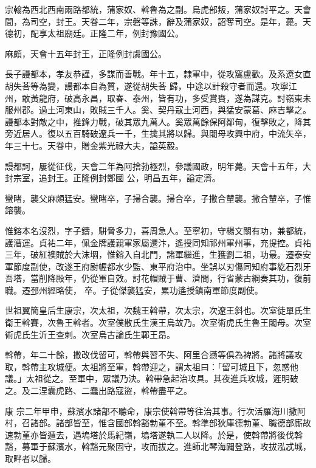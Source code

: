 \begin{pinyinscope}
 宗翰為西北西南兩路都統，蒲家奴、斡魯為之副。烏虎部叛，蒲家奴討平之。天會間，為司空，封王。天眷二年，宗磐等誅，辭及蒲家奴，詔奪司空。是年，薨。天德初，配享太祖廟廷。正隆二年，例封豫國公。



 麻頗，天會十五年封王，正隆例封虞國公。



 長子謾都本，孝友恭謹，多謀而善戰。年十五，隸軍中，從攻窩盧歡。及系遼女直胡失荅等為變，謾都本自為質，遂從胡失荅
 歸，中途以計殺守者而還。攻寧江州，敢黃龍府，破高永昌，取春、泰州，皆有功，多受賞賚，遂為謀克。討嶺東未服州郡。過土河東山，敗賊三千人。奚、契丹寇土河西，與猛安蒙葛、麻吉擊之。謾都本對敵之中，推鋒力戰，破其眾九萬人。奚眾萬餘保阿鄰甸，復擊敗之，降其旁近居人。復以五百騎破遼兵一千，生擒其將以歸。與闍母攻興中府，中流矢卒，年三十七。天眷中，贈金紫光祿大夫，謚英毅。



 謾都訶，屢從征伐，天會二年為阿捨勃極烈，參議國政，明年薨。天會十五年，大封宗室，追封王。正隆例封鄭國
 公，明昌五年，謚定濟。



 蠻睹，襲父麻頗猛安。蠻睹卒，子掃合襲。掃合卒，子撒合輦襲。撒合輦卒，子惟鎔襲。



 惟鎔本名沒烈，字子鑄，駢脅多力，喜周急人。至寧初，守楊文關有功，兼都統，護漕運。貞祐二年，佩金牌護親軍家屬遷汴，遙授同知祁州軍州事，充提控。貞祐三年，破紅襖賊於大沫堌，惟鎔入自北門，諸軍繼進，生獲劉二祖，功最。遷泰安軍節度副使，改遂王府尉幄都水少監、東平府治中。坐誤以刃傷同知府事紇石烈牙吾塔，當削降殿年，仍從軍自效。討花帽賊于曹、濟間，行省蒙古綱奏其功，復前職。遷邳州經略使，
 卒。子從傑襲猛安，累功遙授鎮南軍節度副使。



 世祖翼簡皇后生康宗，次太祖，次魏王斡帶，次太宗，次遼王斜也。次室徒單氏生衛王斡賽，次魯王斡者。次室僕散氏生漢王烏故乃。次室術虎氏生魯王闍母。次室術虎氏生沂王查刺。次室烏古論氏生鄆王昂。



 斡帶，年二十餘，撒改伐留可，斡帶與習不失、阿里合懣等俱為裨將。諸將議攻取，斡帶主攻城便。太祖將至軍，斡帶迎之，謂太祖曰：「留可城且下，忽惑他議。」太祖從之。至軍中，眾議乃決。斡帶急起治攻具。其夜進兵攻城，遲明破之。及二涅囊虎路、二蠢出路寇盜，斡帶盡平之。



 康
 宗二年甲申，蘇濱水諸部不聽命，康宗使斡帶等往治其事。行次活羅海川撒阿村，召諸部。諸部皆至，惟含國部斡豁勃堇不至。斡準部狄庫德勃堇、職德部廝故速勃堇亦皆遁去，遇塢塔於馬紀嶺，塢塔遂執二人以降。於是，使斡帶將後伐斡豁，募軍于蘇濱水，斡豁元聚固守，攻而拔之。進師北琴海闢登路，攻拔泓忒城，取畔者以歸。




\end{pinyinscope}
